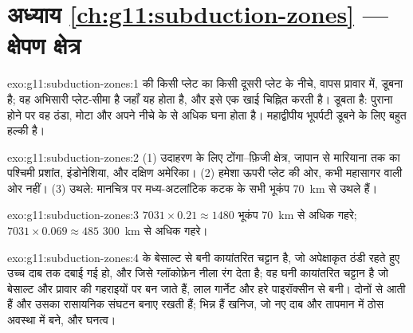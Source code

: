 \section*{अध्याय \ref{ch:g11:subduction-zones} --- क्षेपण क्षेत्र}

\begin{solution}{exo:g11:subduction-zones:1}
  की किसी प्लेट का किसी दूसरी प्लेट के नीचे, वापस
प्रावार में, डूबना है;  वह अभिसारी प्लेट-सीमा है जहाँ यह
होता है, और इसे एक खाई चिह्नित करती है।  डूबता है: पुराना होने पर
वह ठंडा, मोटा और अपने नीचे के  से अधिक घना होता है।
महाद्वीपीय भूपर्पटी डूबने के लिए बहुत हल्की है।
\end{solution}

\begin{solution}{exo:g11:subduction-zones:2}
(1) उदाहरण के लिए टोंगा--फ़िजी क्षेत्र, जापान से मारियाना तक का पश्चिमी
प्रशांत, इंडोनेशिया, और दक्षिण अमेरिका। (2) हमेशा ऊपरी प्लेट की
ओर, कभी महासागर वाली ओर नहीं। (3) उथले: मानचित्र पर मध्य-अटलांटिक कटक के
सभी भूकंप \qty{70}{km} से उथले हैं।
\end{solution}

\begin{solution}{exo:g11:subduction-zones:3}
$7031 \times 0.21 \approx 1480$ भूकंप \qty{70}{km} से अधिक गहरे;
$7031 \times 0.069 \approx 485$ \qty{300}{km} से अधिक गहरे।
\end{solution}

\begin{solution}{exo:g11:subduction-zones:4}
  के बेसाल्ट से बनी कायांतरित चट्टान है, जो
अपेक्षाकृत ठंडी रहते हुए उच्च दाब तक दबाई गई हो, और जिसे ग्लॉकोफ़ेन नीला रंग देता है;
 वह घनी कायांतरित चट्टान है जो बेसाल्ट और  प्रावार की गहराइयों पर
बन जाते हैं, लाल गार्नेट और हरे पाइरॉक्सीन से बनी। दोनों
 से आती हैं और उसका रासायनिक संघटन बनाए रखती हैं; भिन्न हैं
खनिज, जो नए दाब और तापमान में ठोस अवस्था में बने,
और घनत्व।
\end{solution}

